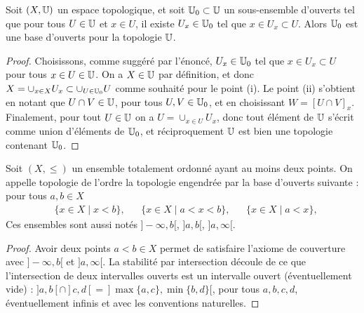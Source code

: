 \begin{corollary}
\label{corol:baseOuverts}
%
Soit $(X,\mathbb{U})$ un espace topologique, et soit $\mathbb{U}_0 \subset \mathbb{U}$ un sous-ensemble d'ouverts tel que pour tous $U \in \mathbb{U}$ et $x \in U$, il existe $U_x \in \mathbb{U}_0$ tel que $x \in U_x \subset U$. 
Alors $\mathbb{U}_0$ est une base d'ouverts pour la topologie $\mathbb{U}$. 
\end{corollary}

\begin{proof}
	Choisissons, comme suggéré par l'énoncé, $U_x \in \mathbb{U}_0$ tel que $x \in U_x \subset U$ pour tous $x \in U \in \mathbb{U}$. 
	On a $X \in \mathbb{U}$ par définition, et donc $X = \cup_{x \in X} U_x \subset \cup_{U \in \mathbb{U}_0} U$ comme souhaité pour le point (i). 
	Le point (ii) s'obtient en notant que $U \cap V \in \mathbb{U}$, pour tous $U,V \in \mathbb{U}_0$, et en choisissant $W = [U\cap V]_x$. 
	Finalement, pour tout $U \in \mathbb{U}$ on a $U = \cup_{x \in U} U_x$, donc tout élément de $\mathbb{U}$ s'écrit comme union d'éléments de $\mathbb{U}_0$, et réciproquement $\mathbb{U}$ est bien une topologie contenant $\mathbb{U}_0$. 
\end{proof}

\begin{exemple}
\label{ex:topoOrdre}
%
	Soit $(X,\leq)$ un ensemble totalement ordonné ayant au moins deux points. On appelle topologie de l'ordre la topologie engendrée par la base d'ouverts suivante : pour tous $a,b \in X$
	\begin{align}
		&\{x\in X\mid x<b\},&
		&\{x\in X\mid a<x<b\},&
		&\{x\in X\mid a<x\}, 
	\end{align}
	Ces ensembles sont aussi notés $]-\infty,b[$, $]a,b[$, $]a,\infty[$.
\end{exemple}

\begin{proof}
	Avoir deux points $a<b \in X$ permet de satisfaire l'axiome de couverture avec $]-\infty,b[$ et $]a,\infty[$. 
	La stabilité par intersection découle de ce que l'intersection de deux intervalles ouverts est un intervalle ouvert (éventuellement vide) : $]a,b[ \cap ]c,d[ = ]\max\{a,c\},\min\{b,d\}[$, pour tous $a,b,c,d$, éventuellement infinis et avec les conventions naturelles.
\end{proof}


